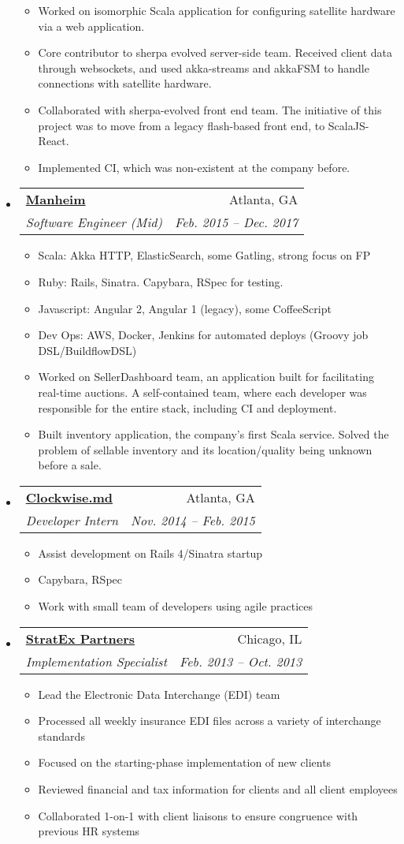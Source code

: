 \documentclass[letterpaper,11pt]{article}
\makeatletter
\newcommand{\resitem}[1]{\item #1 \vspace{-2pt}}
\newcommand{\ressubheading}[4]{
\begin{tabular*}{6.5in}{l@{\extracolsep{\fill}}r}
		\textbf{#1} & #2 \\
		\textit{#3} & \textit{#4} \\
\end{tabular*}\vspace{-6pt}}
\makeatother
\begin{document}
\begin{itemize}
{\begin{itemize}
        \resitem{Worked on isomorphic Scala application for configuring satellite hardware via a web application.}
        \resitem{Core contributor to sherpa evolved server-side team. Received client data through websockets, and used akka-streams
        and akkaFSM to handle connections with satellite hardware.}
        \resitem{Collaborated with sherpa-evolved front end team. The initiative of this project was to move from a legacy flash-based front end,
        to ScalaJS-React.}
        \resitem{Implemented CI, which was non-existent at the company before.}
    \end{itemize}
    }
\item
  \ressubheading{\href{http://www.manheim.com/}{Manheim}}{Atlanta, GA}{Software Engineer (Mid)}{Feb. 2015 -- Dec. 2017}
    { \footnotesize
    \begin{itemize}
        \resitem{Scala: Akka HTTP, ElasticSearch, some Gatling, strong focus on FP}
        \resitem{Ruby: Rails, Sinatra. Capybara, RSpec for testing.}
        \resitem{Javascript: Angular 2, Angular 1 (legacy), some CoffeeScript}
        \resitem{Dev Ops: AWS, Docker, Jenkins for automated deploys (Groovy job DSL/BuildflowDSL)}
        \resitem{Worked on SellerDashboard team, an application built for facilitating real-time auctions.
        A self-contained team, where each developer was responsible for the
        entire stack, including CI and deployment.}
        \resitem{Built inventory application, the company's first Scala
        service. Solved the problem of sellable inventory and its
        location/quality being unknown before a sale.}
    \end{itemize}
    }
\item
\ressubheading{\href{http://www.clockwise.md/}{Clockwise.md}}{Atlanta, GA}{Developer Intern}{Nov. 2014 -- Feb. 2015}
    { \footnotesize
    \begin{itemize}
        \resitem{Assist development on Rails 4/Sinatra startup}
        \resitem{Capybara, RSpec}
        \resitem{Work with small team of developers using agile practices}
    \end{itemize}
    }
\item
  \ressubheading{\href{http://www.stratexpartners.com/}{StratEx Partners}}{Chicago, IL}{Implementation Specialist}{Feb. 2013 -- Oct. 2013}
    { \footnotesize
    \begin{itemize}
        \resitem{Lead the Electronic Data Interchange (EDI) team}
        \resitem{Processed all weekly insurance EDI files across a variety of interchange standards}
        \resitem{Focused on the starting-phase implementation of new clients}
        \resitem{Reviewed financial and tax information for clients and all client employees}
        \resitem{Collaborated 1-on-1 with client liaisons to ensure congruence with previous HR systems}
    \end{itemize}
    }


\end{itemize}
\end{document}
